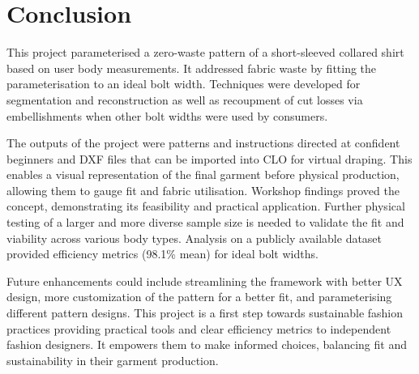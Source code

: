 \chapter{Conclusion}

This project parameterised a zero-waste pattern of a short-sleeved collared shirt based on user body measurements. It addressed fabric waste by fitting the parameterisation to an ideal bolt width. Techniques were developed for segmentation and reconstruction as well as recoupment of cut losses via embellishments when other bolt widths were used by consumers.

The outputs of the project were patterns and instructions directed at confident beginners and DXF files that can be imported into CLO for virtual draping. This enables a visual representation of the final garment before physical production, allowing them to gauge fit and fabric utilisation.
Workshop findings proved the concept, demonstrating its feasibility and practical application. Further physical testing of a larger and more diverse sample size is needed to validate the fit and viability across various body types. Analysis on a publicly available dataset provided efficiency metrics (98.1\% mean) for ideal bolt widths.

Future enhancements could include streamlining the framework with better UX design, more customization of the pattern for a better fit, and parameterising different pattern designs. 
This project is a first step towards sustainable fashion practices providing practical tools and clear efficiency metrics to independent fashion designers. It empowers them to make informed choices, balancing fit and sustainability in their garment production.
